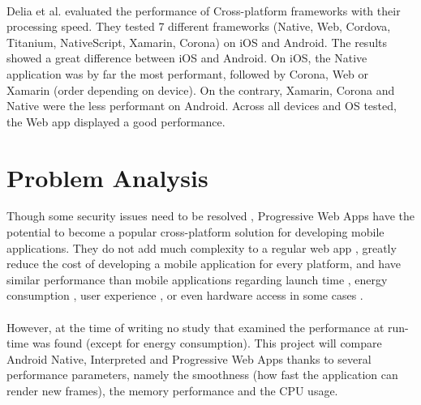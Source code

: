 \documentclass{kththesis}
\begin{document}
\paragraph{}
Delia et al. \cite{delia2017approaches} evaluated the performance of Cross-platform frameworks with their processing speed. They tested 7 different frameworks (Native, Web, Cordova, Titanium, NativeScript, Xamarin, Corona) on iOS and Android. The results showed a great difference between iOS and Android. On iOS, the Native application was by far the most performant, followed by Corona, Web or Xamarin (order depending on device). On the contrary, Xamarin, Corona and Native were the less performant on Android. Across all devices and OS tested, the Web app displayed a good performance. 


\section{Problem Analysis}

Though some security issues need to be resolved \cite{Pride_Prejudice}, Progressive Web Apps have the potential to become a popular cross-platform solution for developing mobile applications. They do not add much complexity to a regular web app \cite{JohannsenFabian2018PWAa}, greatly reduce the cost of developing a mobile application for every platform, and have similar performance than mobile applications regarding launch time \cite{PWApossibleUnifer}\cite{Biorn-Hansen2} \cite{PWAapplicability}, energy consumption \cite{PWAapplicability}, user experience \cite{emulating_native_w_crossplatform}\cite{PWA_UX_comparison_study}, or even hardware access in some cases \cite{PWAbc_responsetime}. 
\paragraph{}

However, at the time of writing no study that examined the performance at run-time was found (except for energy consumption). This project will compare Android Native, Interpreted and Progressive Web Apps thanks to  several performance parameters, namely the smoothness (how fast the application can render new frames), the memory performance and the CPU usage. 
\end{document}
